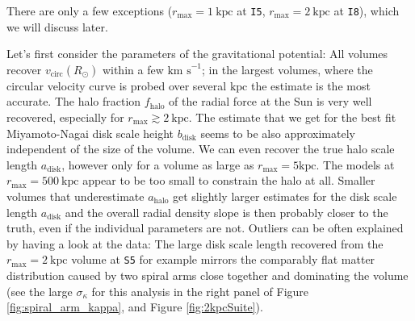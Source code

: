 \documentclass[iop,revtex4,numberedappendix,appendixfloats]{emulateapj}
\begin{document}
There are only a few exceptions ($r_\text{max}=1~\text{kpc}$ at \texttt{I5}, $r_\text{max}=2~\text{kpc}$ at \texttt{I8}), which we will discuss later.

Let's first consider the parameters of the gravitational potential: All volumes recover $v_\text{circ}(R_\odot)$ within a few $\text{km s}^{-1}$; in the largest volumes, where the circular velocity curve is probed over several $\text{kpc}$ the estimate is the most accurate. The halo fraction $f_\text{halo}$ of the radial force at the Sun is very well recovered, especially for $r_\text{max}\gtrsim 2~\text{kpc}$. The estimate that we get for the best fit Miyamoto-Nagai disk scale height $b_\text{disk}$ seems to be also approximately independent of the size of the volume. We can even recover the true halo scale length $a_\text{disk}$, however only for a volume as large as $r_\text{max}=5\text{kpc}$. The models at $r_\text{max}=500~\text{kpc}$ appear to be too small to constrain the halo at all. Smaller volumes that underestimate $a_\text{halo}$ get slightly larger estimates for the disk scale length $a_\text{disk}$ and the overall radial density slope is then probably closer to the truth, even if the individual parameters are not. Outliers can be often explained by having a look at the data: The large disk scale length recovered from the $r_\text{max}=2~\text{kpc}$ volume at \texttt{S5} for example mirrors the comparably flat matter distribution caused by two spiral arms close together and dominating the volume (see the large $\sigma_\kappa$ for this analysis in the right panel of Figure \ref{fig:spiral_arm_kappa}, and Figure \ref{fig:2kpcSuite}). 
\end{document}
